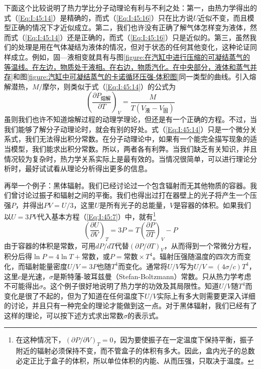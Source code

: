 下面这个比较说明了热力学比分子动理论有利与不利之处：第一，由热力学得出的式（\ref{Eq:I:45:14}）是精确的，而式（\ref{Eq:I:45:16}）只在比方说$U$近似不变，而且模型正确的情况下才近似成立。第二，我们也许没有正确了解气体怎样变为液体，然而式（\ref{Eq:I:45:14}）还是正确的，而式（\ref{Eq:I:45:16}）只是近似的。第三，虽然我们的处理是用在气体凝结为液体的情况，但对于状态的任何其他变化，这种论证同样成立。例如，固—液相变就具有与图\ref{figure:在汽缸中进行压缩的可凝结蒸气的等温线。在左边，物质处于液相。在右边，物质汽化。在中央部分，液体和蒸气并存}和图\ref{figure:汽缸中可凝结蒸气的卡诺循环压强-体积图}同一类型的曲线。引入熔解潜热，$M /\text{摩尔}$，则类似于式（\ref{Eq:I:45:14}）的公式为
\begin{equation*}
    \left(\frac{\partial P_\text{熔解}}{\partial T}\right)_V = \frac{M}{T(V_\text{液} - V_\text{固})}
\end{equation*}
虽则我们也许不知道熔解过程的动理学理论，但还是有一个正确的方程。不过，当我们能够了解分子动理论时，就会有别的好处。式（\ref{Eq:I:45:14}）只是一个微分关系式，我们无法得出积分常数。在分子动理论中，如果有一个能完全描写现象的适当模型，我们能求出积分常数。所以，两者各有利弊。当我们缺乏有关知识，并且情况较为复杂时，热力学关系实际上是最有效的。当情况很简单，可以进行理论分析时，最好试试看从理论分析得出更多的信息。

再举一个例子：黑体辐射。我们已经讨论过一个包含辐射而无其他物质的容器。我们曾讨论过振子和辐射之间的平衡。我们也得出过打在器壁上的光子将产生一个压强$P$，并得出$PV =U /3$，这里$U$是所有光子的总能量，$V$是容器的体积。如果我们以$U =3PV$代入基本方程（\ref{Eq:I:45:7}）中，就有\footnote{在这种情况下，$(\partial P /\partial V)_T =0$，因为要使振子在一定温度下保持平衡，振子附近的辐射必须保持不变，而不管盒子的体积有多大。因此，盒内光子的总数必定正比于盒子的体积，所以单位体积的内能、从而压强，只取决于温度。}
\begin{equation}
    \label{Eq:I:45:17}
    \left(\frac{\partial U}{\partial V}\right)_T = 3P = T\left(\frac{\partial P}{\partial T}\right)_V - P
\end{equation}
由于容器的体积是常数，可用$dP /dT$代替$(\partial P /\partial T)_V$，从而得到一个常微分方程，积分后得$\ln P =4\ln T +\text{常数}$，或$P=\text{常数}\times T^4$。辐射压强随温度的四次方而变化，而辐射能量密度$U/V =3P$也随$T^4$而变化。通常将$U/V$写为$U /V =(4\sigma /c)T^4$，这里$c$是光速，$\sigma$是斯特藩-玻耳兹曼（Stefan-Boltzmann）常数。只从热力学考虑不可能得出$\sigma$。这个例子很好地说明了热力学的功效及其局限性。知道$U/V$随$T^4$而变化是很了不起的，但为了知道在任何温度下$U/V$实际上有多大则需要更深入详细的讨论，并且只有一种完全的理论才能做到这一点。对于黑体辐射，我们已经有了这样的理论，可以按下述方式求出常数$\sigma$的表示式。

